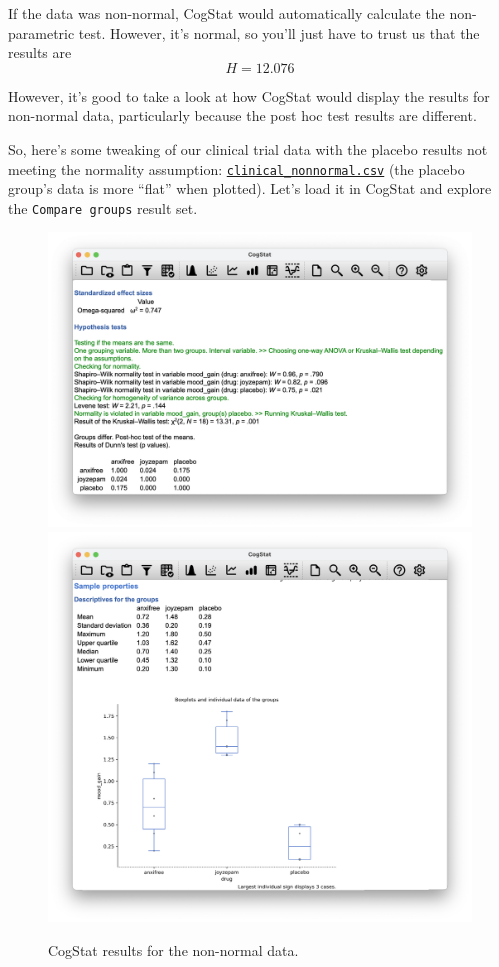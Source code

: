 \documentclass[
]{book}
\theoremstyle{definition}
\theoremstyle{definition}
\theoremstyle{definition}
\theoremstyle{definition}
\theoremstyle{remark}
\begin{document}
If the data was non-normal, CogStat would automatically calculate the non-parametric test. However, it's normal, so you'll just have to trust us that the results are
\[
H = 12.076
\]

However, it's good to take a look at how CogStat would display the results for non-normal data, particularly because the post hoc test results are different.

So, here's some tweaking of our clinical trial data with the placebo results not meeting the normality assumption: \href{resources/data/clinical_nonnormal.csv}{\texttt{clinical\_nonnormal.csv}} (the placebo group's data is more ``flat'' when plotted). Let's load it in CogStat and explore the \texttt{Compare\ groups} result set.

\begin{figure}

{\centering \includegraphics[width=0.66\linewidth]{resources/image/cogstatclinicalnonnormal} \includegraphics[width=0.66\linewidth]{resources/image/cogstatclinicalnonnormalbox} 

}

\caption{CogStat results for the non-normal data.}\label{fig:kruskalclinical}
\end{figure}
\end{document}
